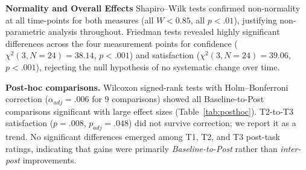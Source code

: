 \documentclass[]{llncs}
\begin{document}
\textbf{Normality and Overall Effects}
Shapiro–Wilk tests confirmed non-normality at all time-points for 
both measures (all $W < 0.85$, all $p < .01$), justifying non-parametric 
analysis throughout. Friedman tests revealed highly significant 
differences across the four measurement points for confidence 
($\chi^2(3, N = 24) = 38.14$, $p < .001$) and satisfaction 
($\chi^2(3, N = 24) = 39.06$, $p < .001$), rejecting the null 
hypothesis of no systematic change over time.

\textbf{Post-hoc comparisons.} Wilcoxon signed-rank tests with 
Holm--Bonferroni correction ($\alpha_{adj}=.006$ for 9 comparisons) 
showed all Baseline-to-Post comparisons significant with large effect 
sizes (Table~\ref{tab:posthoc}). T2-to-T3 satisfaction ($p=.008$, 
$p_{adj}=.048$) did not survive correction; we report it as a trend. 
No significant differences emerged among T1, T2, and T3 post-task 
ratings, indicating that gains were primarily \textit{Baseline-to-Post} 
rather than \textit{inter-post} improvements.
\end{document}
